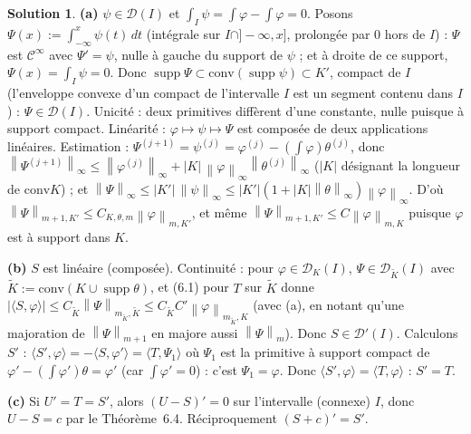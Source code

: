 \documentclass[11pt,a4paper]{article}
\newcommand{\norm}[1]{\left\|#1\right\|}
\newcommand{\Cinf}{\mathcal{C}^\infty}
\DeclareMathOperator{\supp}{supp}
\newcommand{\D}{\mathcal{D}}
\theoremstyle{definition}
\newtheorem*{solution}{Solution}
\begin{document}
\begin{solution}
\noindent\textbf{(a)} $\psi\in\D(I)$ et $\int_I\psi=\int\varphi-\int\varphi=0$. Posons $\Psi(x):=\int_{-\infty}^x\psi(t)\,dt$ (intégrale sur $I\cap]-\infty,x]$, prolongée par $0$ hors de $I$) : $\Psi$ est $\Cinf$ avec $\Psi'=\psi$, nulle à gauche du support de $\psi$ ; et à droite de ce support, $\Psi(x)=\int_I\psi=0$. Donc $\supp\Psi\subset\mathrm{conv}(\supp\psi)\subset K'$, compact de $I$ (l'enveloppe convexe d'un compact de l'intervalle $I$ est un segment contenu dans $I$) : $\Psi\in\D(I)$. Unicité : deux primitives diffèrent d'une constante, nulle puisque à support compact. Linéarité : $\varphi\mapsto\psi\mapsto\Psi$ est composée de deux applications linéaires. Estimation : $\Psi^{(j+1)}=\psi^{(j)}=\varphi^{(j)}-(\int\varphi)\theta^{(j)}$, donc $\norm{\Psi^{(j+1)}}_\infty\le\norm{\varphi^{(j)}}_\infty+|K|\,\norm\varphi_\infty\norm{\theta^{(j)}}_\infty$ ($|K|$ désignant la longueur de $\mathrm{conv}K$) ; et $\norm\Psi_\infty\le|K'|\,\norm\psi_\infty\le|K'|(1+|K|\norm\theta_\infty)\norm\varphi_\infty$. D'où $\norm\Psi_{m+1,K'}\le C_{K,\theta,m}\norm\varphi_{m,K'}$, et même $\norm\Psi_{m+1,K'}\le C\norm\varphi_{m,K}$ puisque $\varphi$ est à support dans $K$.

\medskip
\noindent\textbf{(b)} $S$ est linéaire (composée). Continuité : pour $\varphi\in\D_K(I)$, $\Psi\in\D_{\tilde K}(I)$ avec $\tilde K:=\mathrm{conv}(K\cup\supp\theta)$, et (6.1) pour $T$ sur $\tilde K$ donne $|\langle S,\varphi\rangle|\le C_{\tilde K}\norm\Psi_{m_{\tilde K},\tilde K}\le C_{\tilde K}C'\norm\varphi_{m_{\tilde K},K}$ (avec (a), en notant qu'une majoration de $\norm\Psi_{m+1}$ en majore aussi $\norm\Psi_m$). Donc $S\in\D'(I)$. Calculons $S'$ : $\langle S',\varphi\rangle=-\langle S,\varphi'\rangle=\langle T,\Psi_1\rangle$ où $\Psi_1$ est la primitive à support compact de $\varphi'-(\int\varphi')\theta=\varphi'$ (car $\int\varphi'=0$) : c'est $\Psi_1=\varphi$. Donc $\langle S',\varphi\rangle=\langle T,\varphi\rangle$ : $S'=T$.

\medskip
\noindent\textbf{(c)} Si $U'=T=S'$, alors $(U-S)'=0$ sur l'intervalle (connexe) $I$, donc $U-S=c$ par le Théorème~6.4. Réciproquement $(S+c)'=S'$.


\end{solution}
\end{document}
